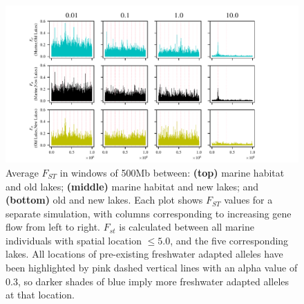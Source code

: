 \documentclass{article}
\begin{document}
\begin{figure}
	\begin{center}
  		\includegraphics[width=1.0\linewidth]{Final_Plots/Fst_Genome_faa_0_5_500.pdf}
  		\caption{
		Average $F_{ST}$ in windows of 500Mb between:
        		\textbf{(top)} marine habitat and old lakes;
        		\textbf{(middle)} marine habitat and new lakes; and
        		\textbf{(bottom)} old and new lakes.
        		Each plot shows $F_{ST}$ values for a separate simulation,
        		with columns corresponding to increasing gene flow from left to right.
		$F_{st}$ is calculated between all marine individuals with spatial location $\le 5.0$, and the five corresponding lakes.
		All locations of pre-existing freshwater adapted alleles have been highlighted by 
		pink dashed vertical lines with an alpha value of 0.3, so darker shades of blue imply more 
		freshwater adapted alleles at that location.
		}
  		\label{fig:fst_5lakes}
	\end{center}
\end{figure}
\end{document}
